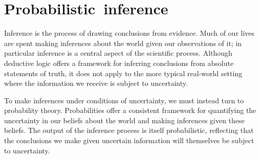 \chapter{\mbox{Probabilistic inference}}\label{ch:probabilistic-inference}

Inference is the process of drawing conclusions from evidence. Much of our lives are spent making inferences about the world given our observations of it; in particular inference is a central aspect of the scientific process. Although deductive logic offers a framework for inferring conclusions from absolute statements of truth, it does not apply to the more typical real-world setting where the information we receive is subject to uncertainty. 

To make inferences under conditions of uncertainty, we must instead turn to probability theory. Probabilities offer a consistent framework for quantifying the uncertainty in our beliefs about the world and making inferences given these beliefs. The output of the inference process is itself probabilistic, reflecting that the conclusions we make given uncertain information will themselves be subject to uncertainty. 


